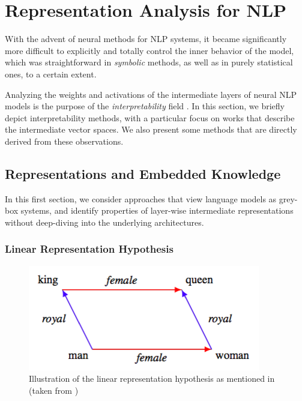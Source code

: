 \chapter{Representation Analysis for NLP}
\label{chap:rw_repr_ana}

With the advent of neural methods for NLP systems, it became significantly more difficult to explicitly and totally control the inner behavior of the model, which was straightforward in \textit{symbolic} methods, as well as in purely statistical ones, to a certain extent. 

Analyzing the weights and activations of the intermediate layers of neural NLP models is the purpose of the \textit{interpretability} field \citep{interpretability_survey}. In this section, we briefly depict interpretability methods, with a particular focus on works that describe the intermediate vector spaces. We also present some methods that are directly derived from these observations.

\section{Representations and Embedded Knowledge}
In this first section, we consider approaches that view language models as grey-box systems, and identify properties of layer-wise intermediate representations without deep-diving into the underlying architectures.

\subsection{Linear Representation Hypothesis}

\begin{figure}[ht]
    \centering
    \includegraphics[width=0.5\linewidth]{sources/related_works/imgs/parallelograms_kawin.png}
    \caption{Illustration of the linear representation hypothesis as mentioned in \citet{mikolov-etal-2013-linguistic} (taken from \citet{ethayarajh-etal-2019-towards})}
    \label{fig:parallelo}
\end{figure}

